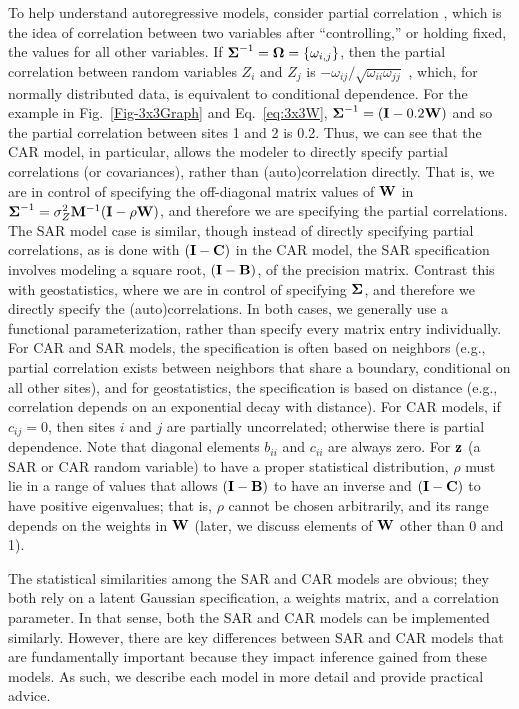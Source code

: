 \documentclass[11pt, titlepage]{article}\usepackage[]{graphicx}\usepackage[]{color}
\begin{document}
\begin{spacing}{1.9}
\begin{flushleft}
To help understand autoregressive models, consider partial correlation \citep[e.g.,][pg. 361]{Sned:Coch:stat:1980}, which is the idea of correlation between two variables after ``controlling,'' or holding fixed, the values for all other variables. If $\mbox{\boldmath $\Sigma$}^{-1} = \mbox{\boldmath $\Omega$} = \{\omega_{i,j}\}$, then the partial correlation between random variables $Z_i$ and $Z_j$ is $-\omega_{ij}/\sqrt{\omega_{ii}\omega_{jj}}$ \citep[pg. 120]{Laur:grap:1996}, which, for normally distributed data, is equivalent to conditional dependence. For the example in Fig.~\ref{Fig-3x3Graph} and Eq.~\ref{eq:3x3W}, $\mbox{\boldmath $\Sigma$}^{-1} = (\mathbf{I} - 0.2\mathbf{W})$ and so the partial correlation between sites 1 and 2 is 0.2. Thus, we can see that the CAR model, in particular, allows the modeler to directly specify partial correlations (or covariances), rather than (auto)correlation directly. That is, we are in control of specifying the off-diagonal matrix values of $\mathbf{W}$ in $\mbox{\boldmath $\Sigma$}^{-1} = \sigma^2_Z\mathbf{M}^{-1}(\mathbf{I}-\rho\mathbf{W})$, and therefore we are specifying the partial correlations. The SAR model case is similar, though instead of directly specifying partial correlations, as is done with $(\mathbf{I} - \mathbf{C})$ in the CAR model, the SAR specification involves modeling a square root, $(\mathbf{I} - \mathbf{B})$, of the precision matrix. Contrast this with geostatistics, where we are in control of specifying $\mbox{\boldmath $\Sigma$}$, and therefore we directly specify the (auto)correlations.  In both cases, we generally use a functional parameterization, rather than specify every matrix entry individually.  For CAR and SAR models, the specification is often based on neighbors (e.g., partial correlation exists between neighbors that share a boundary, conditional on all other sites), and for geostatistics, the specification is based on distance (e.g., correlation depends on an exponential decay with distance). For CAR models, if $c_{ij} = 0$, then sites $i$ and $j$ are partially uncorrelated; otherwise there is partial dependence. Note that diagonal elements $b_{ii}$ and $c_{ii}$ are always zero.  For $\mathbf{z}$ (a SAR or CAR random variable) to have a proper statistical distribution, $\rho$ must lie in a range of values that allows $(\mathbf{I}-\mathbf{B})$ to have an inverse and $(\mathbf{I} - \mathbf{C})$ to have positive eigenvalues; that is, $\rho$ cannot be chosen arbitrarily, and its range depends on the weights in $\mathbf{W}$ (later, we discuss elements of $\mathbf{W}$ other than 0 and 1).

The statistical similarities among the SAR and CAR models are obvious; they both rely on a latent Gaussian specification, a weights matrix, and a correlation parameter. In that sense, both the SAR and CAR models can be implemented similarly. However, there are key differences between SAR and CAR models that are fundamentally important because they impact inference gained from these models. As such, we describe each model in more detail and provide practical advice.


\end{flushleft}
\end{spacing}
\end{document}
